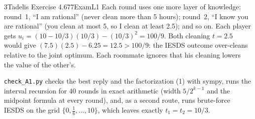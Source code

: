 \begin{exsol}{3}{Tadelis Exercise 4.6}{77}{Exam}{L1}
\interp Each round uses one more layer of knowledge: round~1, ``I am rational'' (never clean more
than 5 hours); round~2, ``I know you are rational'' (you clean at most 5, so I clean at least
2.5); and so on. Each player gets $u_i = (10 - 10/3)(10/3) - (10/3)^2 = 100/9$. Both cleaning
$t = 2.5$ would give $(7.5)(2.5) - 6.25 = 12.5 > 100/9$: the IESDS outcome over-cleans relative to
the joint optimum. Each roommate ignores that his cleaning lowers the value of the other's.

\verify \texttt{check\_A1.py} checks the best reply and the factorization (1) with sympy, runs the
interval recursion for 40 rounds in exact arithmetic (width $5/2^{k-1}$ and the midpoint formula
at every round), and, as a second route, runs brute-force IESDS on the grid
$\{0, \tfrac16, \dots, 10\}$, which leaves exactly $t_1 = t_2 = 10/3$.

\end{exsol}
